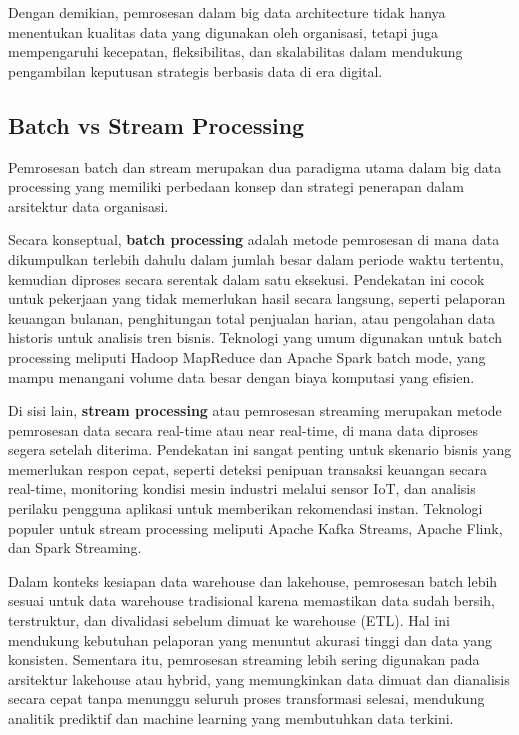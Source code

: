 Dengan demikian, pemrosesan dalam big data architecture tidak hanya menentukan kualitas data yang digunakan oleh organisasi, tetapi juga mempengaruhi kecepatan, fleksibilitas, dan skalabilitas dalam mendukung pengambilan keputusan strategis berbasis data di era digital.


\subsection{Batch vs Stream Processing}

Pemrosesan batch dan stream merupakan dua paradigma utama dalam big data processing yang memiliki perbedaan konsep dan strategi penerapan dalam arsitektur data organisasi.

Secara konseptual, \textbf{batch processing} adalah metode pemrosesan di mana data dikumpulkan terlebih dahulu dalam jumlah besar dalam periode waktu tertentu, kemudian diproses secara serentak dalam satu eksekusi. Pendekatan ini cocok untuk pekerjaan yang tidak memerlukan hasil secara langsung, seperti pelaporan keuangan bulanan, penghitungan total penjualan harian, atau pengolahan data historis untuk analisis tren bisnis. Teknologi yang umum digunakan untuk batch processing meliputi Hadoop MapReduce dan Apache Spark batch mode, yang mampu menangani volume data besar dengan biaya komputasi yang efisien.

Di sisi lain, \textbf{stream processing} atau pemrosesan streaming merupakan metode pemrosesan data secara real-time atau near real-time, di mana data diproses segera setelah diterima. Pendekatan ini sangat penting untuk skenario bisnis yang memerlukan respon cepat, seperti deteksi penipuan transaksi keuangan secara real-time, monitoring kondisi mesin industri melalui sensor IoT, dan analisis perilaku pengguna aplikasi untuk memberikan rekomendasi instan. Teknologi populer untuk stream processing meliputi Apache Kafka Streams, Apache Flink, dan Spark Streaming.

Dalam konteks kesiapan data warehouse dan lakehouse, pemrosesan batch lebih sesuai untuk data warehouse tradisional karena memastikan data sudah bersih, terstruktur, dan divalidasi sebelum dimuat ke warehouse (ETL). Hal ini mendukung kebutuhan pelaporan yang menuntut akurasi tinggi dan data yang konsisten. Sementara itu, pemrosesan streaming lebih sering digunakan pada arsitektur lakehouse atau hybrid, yang memungkinkan data dimuat dan dianalisis secara cepat tanpa menunggu seluruh proses transformasi selesai, mendukung analitik prediktif dan machine learning yang membutuhkan data terkini.

